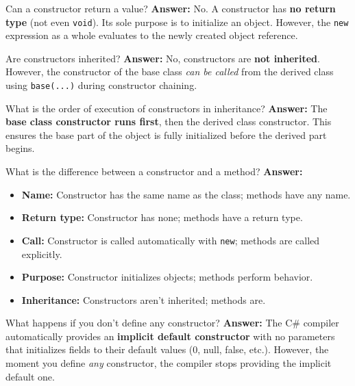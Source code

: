 \documentclass[11pt,a4paper]{article}
\begin{document}
\begin{intqBox}{Can a constructor return a value?}
\textbf{Answer:} No. A constructor has \textbf{no return type} (not even \texttt{void}). Its sole purpose is to initialize an object. However, the \texttt{new} expression as a whole evaluates to the newly created object reference.
\end{intqBox}

\begin{intqBox}{Are constructors inherited?}
\textbf{Answer:} No, constructors are \textbf{not inherited}. However, the constructor of the base class \textit{can be called} from the derived class using \texttt{base(...)} during constructor chaining.
\end{intqBox}

\begin{intqBox}{What is the order of execution of constructors in inheritance?}
\textbf{Answer:} The \textbf{base class constructor runs first}, then the derived class constructor. This ensures the base part of the object is fully initialized before the derived part begins.
\end{intqBox}

\begin{intqBox}{What is the difference between a constructor and a method?}
\textbf{Answer:}
\begin{itemize}[leftmargin=*]
    \item \textbf{Name:} Constructor has the same name as the class; methods have any name.
    \item \textbf{Return type:} Constructor has none; methods have a return type.
    \item \textbf{Call:} Constructor is called automatically with \texttt{new}; methods are called explicitly.
    \item \textbf{Purpose:} Constructor initializes objects; methods perform behavior.
    \item \textbf{Inheritance:} Constructors aren't inherited; methods are.
\end{itemize}
\end{intqBox}

\begin{intqBox}{What happens if you don't define any constructor?}
\textbf{Answer:} The C\# compiler automatically provides an \textbf{implicit default constructor} with no parameters that initializes fields to their default values (0, null, false, etc.). However, the moment you define \textit{any} constructor, the compiler stops providing the implicit default one.
\end{intqBox}
\end{document}
